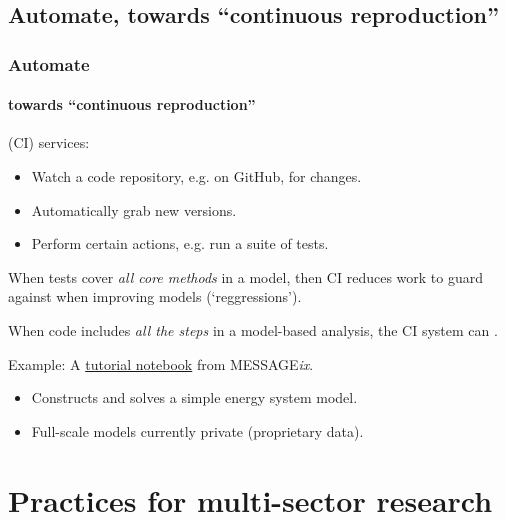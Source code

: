 \documentclass[12pt,aspectratio=169]{beamer}
\begin{document}
\subsection{Automate, towards “continuous reproduction”}
\begin{frame}
\frametitle{Automate}
\framesubtitle{towards “continuous reproduction”}

 (CI) services:
\begin{itemize}
  \item Watch a code repository, e.g. on GitHub, for changes.
  \item Automatically grab new versions.
  \item Perform certain actions, e.g. run a suite of tests.
\end{itemize}

\medskip
When tests cover \emph{all core methods} in a model, then CI reduces work to guard against  when improving models (‘reggressions’).

\medskip
When code includes \emph{all the steps} in a model-based analysis, the CI system can .

Example: A \href{https://github.com/iiasa/message_ix/blob/main/tutorial/westeros/westeros_baseline.ipynb}{tutorial notebook} from MESSAGE\emph{ix}.
\begin{itemize}
  \item Constructs and solves a simple energy system model.
  \item Full-scale models currently private (proprietary data).
\end{itemize}

\end{frame}


\section{Practices for multi-sector research}

\begin{frame}[plain]
\tableofcontents[currentsection]
\end{frame}
\end{document}
